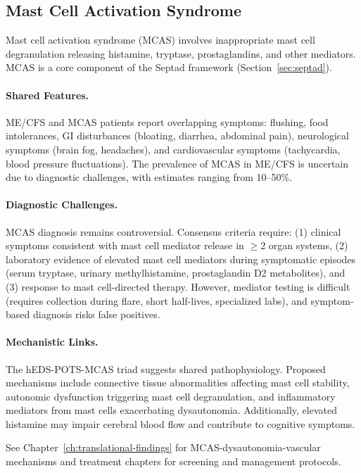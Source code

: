 \subsection{Mast Cell Activation Syndrome}

Mast cell activation syndrome (MCAS) involves inappropriate mast cell degranulation releasing histamine, tryptase, prostaglandins, and other mediators. MCAS is a core component of the Septad framework (Section~\ref{sec:septad}).

\paragraph{Shared Features.}
ME/CFS and MCAS patients report overlapping symptoms: flushing, food intolerances, GI disturbances (bloating, diarrhea, abdominal pain), neurological symptoms (brain fog, headaches), and cardiovascular symptoms (tachycardia, blood pressure fluctuations). The prevalence of MCAS in ME/CFS is uncertain due to diagnostic challenges, with estimates ranging from 10--50\%.

\paragraph{Diagnostic Challenges.}
MCAS diagnosis remains controversial. Consensus criteria require: (1) clinical symptoms consistent with mast cell mediator release in $\geq$2 organ systems, (2) laboratory evidence of elevated mast cell mediators during symptomatic episodes (serum tryptase, urinary methylhistamine, prostaglandin D2 metabolites), and (3) response to mast cell-directed therapy. However, mediator testing is difficult (requires collection during flare, short half-lives, specialized labs), and symptom-based diagnosis risks false positives.

\paragraph{Mechanistic Links.}
The hEDS-POTS-MCAS triad suggests shared pathophysiology. Proposed mechanisms include connective tissue abnormalities affecting mast cell stability, autonomic dysfunction triggering mast cell degranulation, and inflammatory mediators from mast cells exacerbating dysautonomia. Additionally, elevated histamine may impair cerebral blood flow and contribute to cognitive symptoms.

See Chapter~\ref{ch:translational-findings} for MCAS-dysautonomia-vascular mechanisms and treatment chapters for screening and management protocols.

